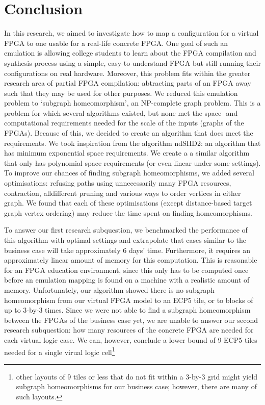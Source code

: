 \chapter{Conclusion}
\label{chapter:conclusion}
In this research, we aimed to investigate how to map a configuration for a virtual FPGA to one usable for a real-life concrete FPGA. One goal of such an emulation is allowing college students to learn about the FPGA compilation and synthesis process using a simple, easy-to-understand FPGA but still running their configurations on real hardware. Moreover, this problem fits within the greater research area of partial FPGA compilation: abtracting parts of an FPGA away such that they may be used for other purposes.  We reduced this emulation problem to `subgraph homeomorphism', an NP-complete graph problem. This is a problem for which several algorithms existed, but none met the space- and computational requirements needed for the scale of the inputs (graphs of the FPGAs). Because of this, we decided to create an algorithm that does meet the requirements. We took inspiration from the algorithm ndSHD2: an algorithm that has minimum exponential space requirements. We create a a similar algorithm that only has polynomial space requirements (or even linear under some settings). To improve our chances of finding subgraph homeomorphisms, we added several optimisations: refusing paths using unnecessarily many FPGA resources, contraction, alldifferent pruning and various ways to order vertices in either graph. We found that each of these optimisations (except distance-based target graph vertex ordering) may reduce the time spent on finding homeomorphisms.

To answer our first research subquestion, we benchmarked the performance of this algorithm with optimal settings and extrapolate that cases similar to the business case will take approximately 6 days' time. Furthermore, it requires an approximately linear amount of memory for this computation. This is reasonable for an FPGA education environment, since this only has to be computed once before an emulation mapping is found on a machine with a realistic amount of memory. Unfortunately, our algorithm showed there is no subgraph homeomorphism from our virtual FPGA model to an ECP5 tile, or to blocks of up to 3-by-3 times. Since we were not able to find a subgraph homeomorphism between the FPGAs of the business case yet, we are unable to answer our second research subquestion: how many resources of the concrete FPGA are needed for each virtual logic case. We can, however, conclude a lower bound of 9 ECP5 tiles needed for a single virual logic cell\footnote{other layouts of 9 tiles or less that do not fit within a 3-by-3 grid might yield subgraph homeomorphisms for our business case; however, there are many of such layouts.}

